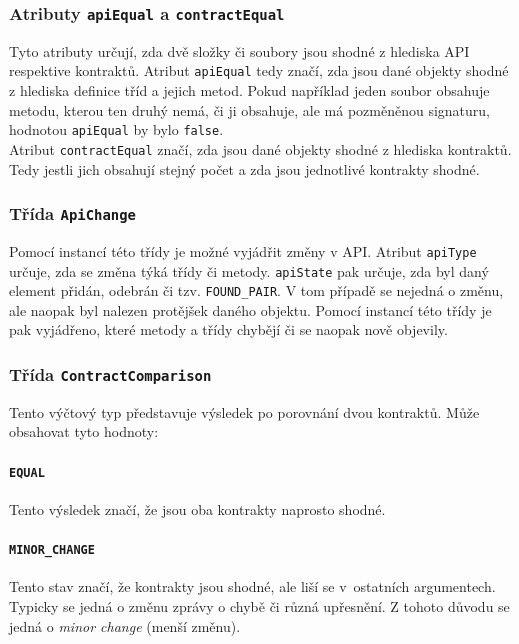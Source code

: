 					\subsubsection{Atributy \texttt{apiEqual} a \texttt{contractEqual}}
						Tyto atributy určují, zda dvě složky či soubory jsou shodné z hlediska API respektive kontraktů. Atribut \texttt{apiEqual} tedy značí, zda jsou dané objekty shodné z hlediska definice tříd a jejich metod. Pokud například jeden soubor obsahuje metodu, kterou ten druhý nemá, či ji obsahuje, ale má pozměněnou signaturu, hodnotou \texttt{apiEqual} by bylo \texttt{false}.\\
						
						Atribut \texttt{contractEqual} značí, zda jsou dané objekty shodné z hlediska kontraktů. Tedy jestli jich obsahují stejný počet a zda jsou jednotlivé kontrakty shodné.
		
					\subsubsection{Třída \texttt{ApiChange}}
						Pomocí instancí této třídy je možné vyjádřit změny v API. Atribut \texttt{apiType} určuje, zda se změna týká třídy či metody. \texttt{apiState} pak určuje, zda byl daný element přidán, odebrán či tzv. \texttt{FOUND\_PAIR}. V tom případě se nejedná o změnu, ale naopak byl nalezen protějšek daného objektu. Pomocí instancí této třídy je pak vyjádřeno, které metody a třídy chybějí či se naopak nově objevily.
						
					\subsubsection{Třída \texttt{ContractComparison}}
						Tento výčtový typ představuje výsledek po porovnání dvou kontraktů. Může obsahovat tyto hodnoty:
						
						\paragraph{\texttt{EQUAL}}
							Tento výsledek značí, že jsou oba kontrakty naprosto shodné.
						
						\paragraph{\texttt{MINOR\_CHANGE}}
							Tento stav značí, že kontrakty jsou shodné, ale liší se v~ostatních argumentech. Typicky se jedná o změnu zprávy o chybě či různá upřesnění. Z tohoto důvodu se jedná o \emph{minor change} (menší změnu).
							
